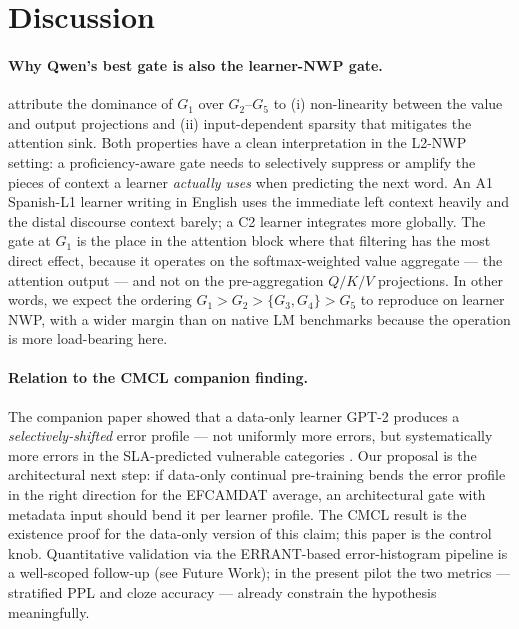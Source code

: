 \section{Discussion}
\label{sec:discussion}

\paragraph{Why Qwen's best gate is also the learner-NWP gate.}
\citet{qiu2025gated} attribute the dominance of $G_1$ over $G_2$--$G_5$
to (i) non-linearity between the value and output projections and (ii)
input-dependent sparsity that mitigates the attention sink. Both
properties have a clean interpretation in the L2-NWP setting: a
proficiency-aware gate needs to selectively suppress or amplify the
pieces of context a learner \emph{actually uses} when predicting the
next word. An A1 Spanish-L1 learner writing in English uses the
immediate left context heavily and the distal discourse context
barely; a C2 learner integrates more globally. The gate at $G_1$ is
the place in the attention block where that filtering has the most
direct effect, because it operates on the softmax-weighted value
aggregate --- the attention output --- and not on the pre-aggregation
$Q/K/V$ projections. In other words, we expect the ordering
$G_1 > G_2 > \{G_3, G_4\} > G_5$ to reproduce on learner NWP, with a
wider margin than on native LM benchmarks because the operation is
more load-bearing here.

\paragraph{Relation to the CMCL companion finding.}
The companion paper showed that a data-only learner GPT-2 produces a
\emph{selectively-shifted} error profile --- not uniformly more errors,
but systematically more errors in the SLA-predicted vulnerable
categories \citep{stearns2026artificial}. Our proposal is the
architectural next step: if data-only continual pre-training bends the
error profile in the right direction for the EFCAMDAT average, an
architectural gate with metadata input should bend it per learner
profile. The CMCL result is the existence proof for the data-only
version of this claim; this paper is the control knob. Quantitative
validation via the ERRANT-based error-histogram pipeline is a
well-scoped follow-up (see Future Work); in the present pilot the
two metrics --- stratified PPL and cloze accuracy --- already
constrain the hypothesis meaningfully.

